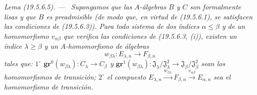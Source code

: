 \documentclass[10pt,oneside]{book}
\makeatletter
\newcommand{\setmanualcurrentlabel}[1]{\def\@currentlabel{#1}}
\newenvironment{lemma}[1][]{%
  \setmanualcurrentlabel{#1}\par\medskip\noindent\itshape Lema (#1). ---\ }{\par}
\makeatother
\begin{document}
\begin{lemma}[19.5.6.5]
\label{0.19.5.6.5-es}
Supongamos que las $A$-álgebras $B$ y $C$ son formalmente lisas y que
$B$ es preadmisible (de modo que, en virtud de \textup{(19.5.6.1)}, se satisfacen las
condiciones de \textup{(19.5.6.3)}). Para todo sistema de dos índices
$\alpha\leq\beta$ y de un homomorfismo $v_{\alpha\beta}$ que verifica las
condiciones de \textup{(19.5.6.3, (i))}, existen un índice $\lambda\geq\beta$ y un
$A$-homomorfismo de álgebras
\[
  w_{\beta\lambda}:E_{\lambda,n}\longrightarrow F_{\beta,n}
\]
tales que: $1^\circ$ $\mathbf{gr}^0(w_{\beta\lambda}):C_\lambda\to C_\beta$ y
$\mathbf{gr}^1(w_{\beta\lambda}):
\mathfrak J_\lambda/\mathfrak J_\lambda^2\to
\mathfrak J_\beta/\mathfrak J_\beta^2$ sean los homomorfismos de
transición; $2^\circ$ el compuesto
$E_{\lambda,n}\xrightarrow{w_{\beta\lambda}}F_{\beta,n}
\xrightarrow{v_{\alpha\beta}}E_{\alpha,n}$ sea el homomorfismo de transición.
\end{lemma}
\end{document}
